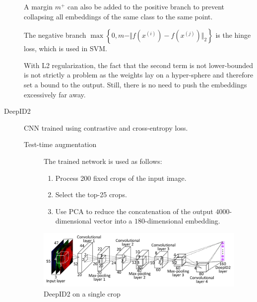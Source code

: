 \begin{description}
            \begin{remark}
                A margin $m^+$ can also be added to the positive branch to prevent collapsing all embeddings of the same class to the same point.
            \end{remark}

            \begin{remark}
                The negative branch $\max\left\{0, m - \Vert f(x^{(i)}) - f(x^{(j)}) \Vert_2\right\}$ is the hinge loss, which is used in SVM.
            \end{remark}

            \begin{remark}
                With L2 regularization, the fact that the second term is not lower-bounded is not strictly a problem as the weights lay on a hyper-sphere and therefore set a bound to the output. Still, there is no need to push the embeddings excessively far away.
            \end{remark}

    \item[DeepID2] 
            CNN trained using contrastive and cross-entropy loss.

            \begin{description}
                \item[Test-time augmentation]
                    The trained network is used as follows:
                    \begin{enumerate}
                        \item Process 200 fixed crops of the input image.
                        \item Select the top-25 crops.
                        \item Use PCA to reduce the concatenation of the output $4000$-dimensional vector into a $180$-dimensional embedding.
                    \end{enumerate}
            \end{description}

            \begin{figure}[H]
                \centering
                \includegraphics[width=0.7\linewidth]{./img/deepid2.png}
                \caption{DeepID2 on a single crop}
            \end{figure}
\end{description}

